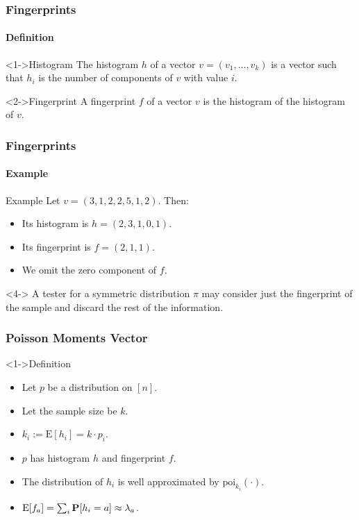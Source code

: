 \documentclass{beamer}
\newcommand{\E}{\mbox{E}} \newcommand{\Cov}{\mbox{Cov}}
\begin{document}
\begin{frame}
  \frametitle{Fingerprints} \framesubtitle{Definition}

  \begin{block}<1->{Histogram}
    The histogram $h$ of a vector $v=(v_1,\ldots,v_k)$ is a vector such
    that $h_i$ is the number of components of $v$ with value $i$.
  \end{block}
  \begin{block}<2->{Fingerprint}
    A fingerprint $f$ of a vector $v$ is the histogram of the
    histogram of $v$.
  \end{block}
\end{frame}

\begin{frame}
  \frametitle{Fingerprints} \framesubtitle{Example}

  \begin{block}{Example}
    Let $v=(3,1,2,2,5,1,2)$. Then:
    \begin{itemize}
    \item<1-> Its histogram is $h=(2,3,1,0,1)$.
    \item<2-> Its fingerprint is $f=(2,1,1)$.
    \item<3-> We omit the zero component of $f$.
    \end{itemize}
  \end{block}
  \begin{block}<4->{} A tester for a symmetric distribution $\pi$ may
    consider just the fingerprint of the sample and discard the rest
    of the information.
  \end{block}
\end{frame}

\begin{frame}
  \frametitle{Poisson Moments Vector}

  \begin{block}<1->{Definition}
    \begin{itemize}
    \item<2-> Let $p$ be a distribution on $[n]$.
    \item<3-> Let the sample size be $k$.
    \item<4-> $k_i:=\E[h_i]=k\cdot p_i$.
    \end{itemize}
    
  \end{block}
  \begin{block}{}
    
    \begin{itemize}
    \item<6-> $p$ has histogram $h$ and fingerprint $f$.
    \item<7-> The distribution of $h_i$ is well approximated by
      $\mbox{poi}_{k_i}(\cdot)$.
    \item<8-> $\E[f_a]=\sum_i\P[h_i=a]\approx \lambda_a$.
    \end{itemize}
  \end{block}
\end{frame}
\end{document}
